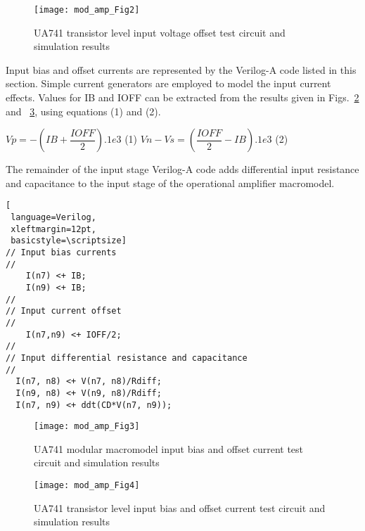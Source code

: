 \begin{figure} [here]
  \centering
  \texttt{[image: mod\_amp\_Fig2]} 
  \caption{UA741 transistor level input voltage offset test circuit and simulation results}
  \label{fig:mod_amp2}
\end{figure} 





Input bias and offset currents are represented by the Verilog-A code
listed in this section. Simple current generators are employed to
model the input current effects. Values for IB and IOFF can be
extracted from the results given in Figs.~\ref{fig:mod_amp3} and
~\ref{fig:mod_amp4}, using equations (1) and (2).

\begin{flushright}
$Vp=-(IB+\dfrac{IOFF}{2}).1e3$   \hspace{5.5cm}(1)
\linebreak  
$Vn-Vs = (\dfrac{IOFF}{2}-IB).1e3$  \hspace{5cm}(2)
\end{flushright}

 The remainder of the input stage Verilog-A code adds differential
 input resistance and capacitance to the input stage of the
 operational amplifier macromodel.

\begin{lstlisting}[
 language=Verilog, 
 xleftmargin=12pt,
 basicstyle=\scriptsize]
// Input bias currents
//
    I(n7) <+ IB;
    I(n9) <+ IB;
//
// Input current offset
//
    I(n7,n9) <+ IOFF/2;
//
// Input differential resistance and capacitance
//
  I(n7, n8) <+ V(n7, n8)/Rdiff;
  I(n9, n8) <+ V(n9, n8)/Rdiff;
  I(n7, n9) <+ ddt(CD*V(n7, n9));
\end{lstlisting}

\begin{figure} [here]
  \centering
  \texttt{[image: mod\_amp\_Fig3]}
  \caption{UA741 modular macromodel input bias and offset current test circuit and simulation results}
  \label{fig:mod_amp3}
\end{figure} 

\begin{figure} [here]
  \centering
  \texttt{[image: mod\_amp\_Fig4]}
  \caption{UA741 transistor level input bias and offset current test circuit and simulation results}
  \label{fig:mod_amp4}
\end{figure} 


